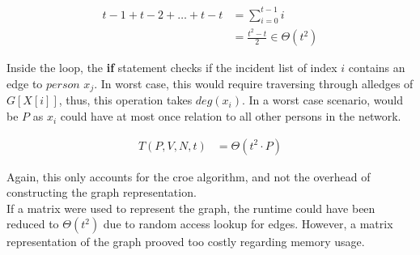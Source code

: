 \begin{align*}
t-1 + t-2 + \dots + t-t &= \sum^{t-1}_{i=0} i \\
 & = \frac{t^2-t}{2} \in \Theta \left( t^2 \right)
\end{align*} 

Inside the loop, the \textbf{if} statement checks if
the incident list of index $i$ contains an edge to $person$
$x_j$. In worst case, this would require traversing through 
alledges of $G[X[i]]$, thus, this operation takes $deg(x_i)$.
In a worst case scenario, would be $P$ as $x_i$ could
have at most once relation to all other persons in the 
network.

\begin{align*}
T(P, V, N, t) &= \Theta \left( t^2 \cdot P \right)
\end{align*}

Again, this only accounts for the croe algorithm, and not 
the overhead of constructing the graph representation.\\

If a matrix were used to represent the graph, the runtime could have
been reduced to $\Theta \left( t^2 \right)$ due to random access
lookup for edges. However, a matrix representation of the graph 
prooved too costly regarding memory usage.







